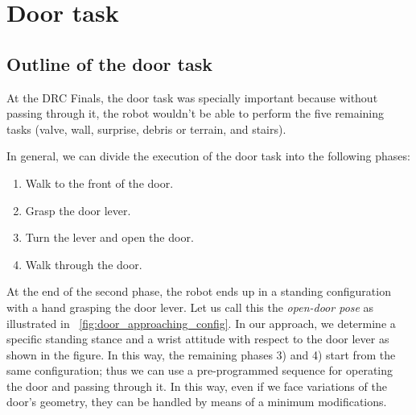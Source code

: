 \section{Door task}
	\label{sub:door}

\subsection{Outline of the door task}
%
At the DRC Finals, the door task was specially important because without passing through it,
the robot wouldn't be able to perform the five remaining tasks
(valve, wall, surprise, debris or terrain, and stairs).
   
In general, we can divide the execution of the door task into the following phases:
%
\begin{enumerate}
	\item Walk to the front of the door.
	\item Grasp the door lever.
	\item Turn the lever and open the door.
	\item Walk through the door.
\end{enumerate}
%

%

At the end of the second phase, the robot ends up in a standing configuration with a hand grasping
the door lever.
Let us call this the {\it open-door pose} as illustrated in \figurename~\ref{fig:door_approaching_config}.
In our approach, we determine a specific standing stance and a wrist attitude with respect to 
the door lever as shown in the figure.
In this way, the remaining phases 3) and 4) start from the same configuration;
thus we can use a pre-programmed sequence for operating the door and passing through it.
In this way, even if we face variations of the door's geometry,
they can be handled by means of a minimum modifications.

